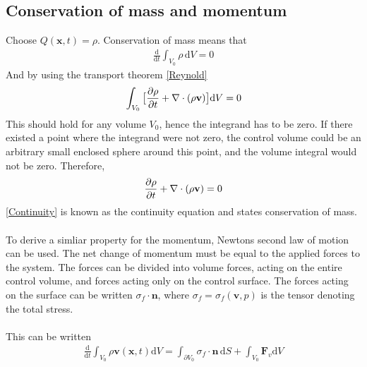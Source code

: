 \subsection{Conservation of mass and momentum}
Choose $Q(\mathbf{x},t) = \rho$. Conservation of mass means that
\begin{align*} 
\frac{\mathrm{d}}{\mathrm{d}t} \int_{V_0} \rho \, \mathrm{d}V = 0
\end{align*}
And by using the transport theorem \eqref{Reynold}
\begin{align}
\int_{V_0} \big{[}\frac{\partial \rho}{\partial t} + \nabla \cdot (\rho \mathbf{v}) \big{]}\mathrm{d}V = 0
\end{align}
This should hold for any volume $V_0$, hence the integrand has to be zero. If there existed a point where the integrand were not zero, the control volume could be an arbitrary small enclosed sphere around this point, and the volume integral would not be zero. Therefore, 
\begin{align} 
\frac{\partial \rho}{\partial t} + \nabla \cdot (\rho \mathbf{v}) = 0 \label{Continuity}
\end{align}
\eqref{Continuity} is known as the continuity equation and states conservation of mass. 
\\
\\
To derive a simliar property for the momentum, Newtons second law of motion can be used. The net change of momentum must be equal to the applied forces to the system. The forces can be divided into volume forces, acting on the entire control volume, and forces acting only on the control surface. The forces acting on the surface can be written $\sigma_f \cdot \mathbf{n}$, where $\sigma_f = \sigma_f(\mathbf{v}, p)$ is the tensor denoting the total stress. \\
\\
This can be written
\begin{align*} \frac{\mathrm{d}}{\mathrm{d}t} \int_{V_0} \rho \mathbf{v}(\mathbf{x},t) \mathrm{d}V = \int_{\partial V_0}\sigma_f \cdot \mathbf{n} \,\mathrm{d}S + \int_{V_0} \mathbf{F}_v \mathrm{d}V
\end{align*}

